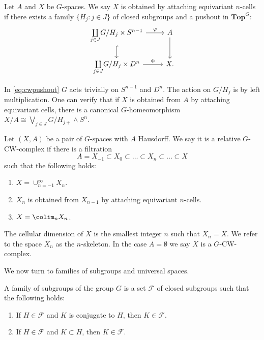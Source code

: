 \begin{mydef}
Let $A$ and $X$ be $G$-spaces. We say $X$ is obtained by attaching equivariant $n$-cells
if there exists a family $\{H_j:j\in J\}$ of closed subgroups and a pushout in $\mathbf{Top}^G$:
\begin{equation}\label{eq:cwpushout}
\begin{tikzcd}
\underset{j\in J}{\coprod} G/H_j\times S^{n-1}
\arrow{r}{\varphi}\arrow[hookrightarrow]{d}
&A\arrow{d}\\
\underset{j\in J}{\coprod} G/H_j\times D^{n}
\arrow{r}{\Phi}
&X.
\end{tikzcd}
\end{equation}
\end{mydef}
In \eqref{eq:cwpushout} $G$ acts trivially on $S^{n-1}$ and $D^n$. The action on $G/H_j$ is
by left multiplication. One can verify that if $X$ is obtained from $A$ by attaching equivariant cells, there is
a canonical $G$-homeomorphism $X/A\cong \bigvee_{j\in J} G/H_{j+}\wedge S^n$.
\begin{mydef}
Let $(X,A)$ be a pair of $G$-spaces with $A$ Hausdorff. We say it is a relative $G$-CW-complex
if there is a filtration
\[
A = X_{-1}\subset X_0\subset \ldots\subset X_n\subset \ldots \subset X
\]
such that the following holds:
\begin{enumerate}
\item $X = \cup_{n = -1}^\infty X_n$.
\item $X_n$ is obtained from $X_{n-1}$ by attaching equivariant $n$-cells.
\item $X = \colim_n X_n$.
\end{enumerate}
The cellular dimension of $X$ is the smallest integer $n$ such that $X_n =X$. We refer
to the space $X_n$ as the $n$-skeleton.
In the case $A=\emptyset$ we say $X$ is a $G$-CW-complex.
\end{mydef}

We now turn to families of subgroups and universal spaces.
\begin{mydef}
A family of subgroups of the group $G$ is a set $\mathcal{F}$
of closed subgroups such that the following holds:
\begin{enumerate}
\item If $H\in \mathcal{F}$ and $K$ is conjugate to $H$, then  $K\in \mathcal{F}$.
\item If $H\in \mathcal{F}$ and $K\subset H$, then  $K\in \mathcal{F}$.
\end{enumerate}
\end{mydef}


